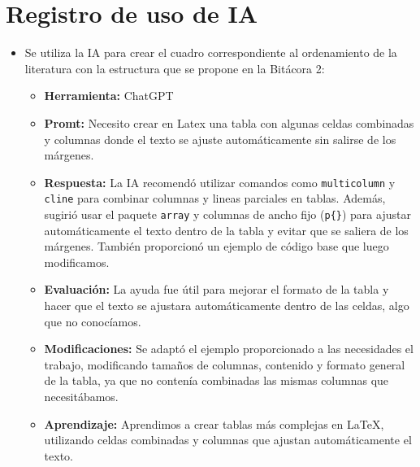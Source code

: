 \documentclass[12pt]{article}
\begin{document}
\section{Registro de uso de IA}
\begin{itemize}
    \item Se utiliza la IA para crear el cuadro correspondiente al ordenamiento de la literatura con la estructura que se propone en la Bitácora 2:
    \begin{itemize}
        \item \textbf{Herramienta:} ChatGPT
        \item \textbf{Promt:} Necesito crear en Latex una tabla con algunas celdas combinadas y columnas donde el texto se ajuste automáticamente sin salirse de los márgenes.
        \item \textbf{Respuesta:} La IA recomendó utilizar comandos como \texttt{multicolumn} y \texttt{cline} para combinar columnas y lineas parciales en tablas. Además, sugirió usar el paquete \texttt{array} y columnas de ancho fijo (\texttt{p\{\}}) para ajustar automáticamente el texto dentro de la tabla y evitar que se saliera de los márgenes. También proporcionó un ejemplo de código base que luego modificamos.
        \item \textbf{Evaluación:} La ayuda fue útil para mejorar el formato de la tabla y hacer que el texto se ajustara automáticamente dentro de las celdas, algo que no conocíamos.
        \item \textbf{Modificaciones:} Se adaptó el ejemplo proporcionado a las necesidades el trabajo, modificando tamaños de columnas, contenido y formato general de la tabla, ya que no contenía combinadas las mismas columnas que necesitábamos.
        \item \textbf{Aprendizaje:} Aprendimos a crear tablas más complejas en LaTeX, utilizando celdas combinadas y columnas que ajustan automáticamente el texto.
    \end{itemize}
    
\end{itemize}
\end{document}
